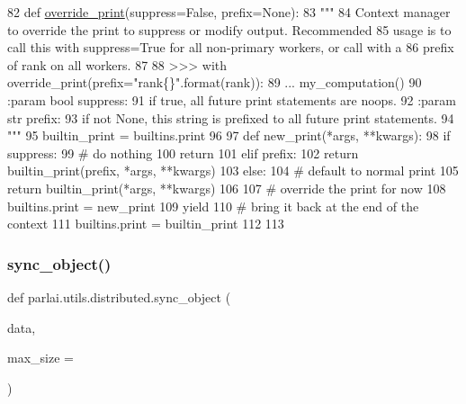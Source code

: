 \begin{DoxyCode}
82 \textcolor{keyword}{def }\hyperlink{namespaceparlai_1_1utils_1_1distributed_a601345e55fc3fc3845c43efa1a04db56}{override\_print}(suppress=False, prefix=None):
83     \textcolor{stringliteral}{"""}
84 \textcolor{stringliteral}{    Context manager to override the print to suppress or modify output. Recommended}
85 \textcolor{stringliteral}{    usage is to call this with suppress=True for all non-primary workers, or call with a}
86 \textcolor{stringliteral}{    prefix of rank on all workers.}
87 \textcolor{stringliteral}{}
88 \textcolor{stringliteral}{    >>> with override\_print(prefix="rank\{\}".format(rank)):}
89 \textcolor{stringliteral}{    ...     my\_computation()}
90 \textcolor{stringliteral}{    :param bool suppress:}
91 \textcolor{stringliteral}{        if true, all future print statements are noops.}
92 \textcolor{stringliteral}{    :param str prefix:}
93 \textcolor{stringliteral}{        if not None, this string is prefixed to all future print statements.}
94 \textcolor{stringliteral}{    """}
95     builtin\_print = builtins.print
96 
97     \textcolor{keyword}{def }new\_print(*args, **kwargs):
98         \textcolor{keywordflow}{if} suppress:
99             \textcolor{comment}{# do nothing}
100             \textcolor{keywordflow}{return}
101         \textcolor{keywordflow}{elif} prefix:
102             \textcolor{keywordflow}{return} builtin\_print(prefix, *args, **kwargs)
103         \textcolor{keywordflow}{else}:
104             \textcolor{comment}{# default to normal print}
105             \textcolor{keywordflow}{return} builtin\_print(*args, **kwargs)
106 
107     \textcolor{comment}{# override the print for now}
108     builtins.print = new\_print
109     \textcolor{keywordflow}{yield}
110     \textcolor{comment}{# bring it back at the end of the context}
111     builtins.print = builtin\_print
112 
113 
\end{DoxyCode}
\mbox{\label{namespaceparlai_1_1utils_1_1distributed_a269d3c7284127d9b287b9b61e9161de6}} 
\subsubsection{\texorpdfstring{sync\+\_\+object()}{sync\_object()}}
{\footnotesize\ttfamily def parlai.\+utils.\+distributed.\+sync\+\_\+object (\begin{DoxyParamCaption}\item[{}]{data,  }\item[{}]{max\+\_\+size = {} }\end{DoxyParamCaption})}

